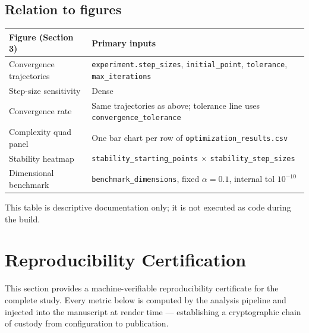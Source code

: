 \documentclass[
]{article}
\newcounter{none} %
\begin{document}
\subsection{Relation to figures}\label{relation-to-figures}

{\def\LTcaptype{none} %
\begin{longtable}[]{@{}
  >{\raggedright\arraybackslash}p{}
  >{\raggedright\arraybackslash}p{}@{}}
\toprule\noalign{}
\begin{minipage}[b]{\linewidth}\raggedright
Figure (Section 3)
\end{minipage} & \begin{minipage}[b]{\linewidth}\raggedright
Primary inputs
\end{minipage} \\
\midrule\noalign{}
\endhead
\bottomrule\noalign{}
\endlastfoot
Convergence trajectories & \texttt{experiment.step\_sizes},
\texttt{initial\_point}, \texttt{tolerance}, \texttt{max\_iterations} \\
Step-size sensitivity & Dense \(\alpha) sweep internal to
\texttt{generate\_step\_size\_sensitivity\_plot()} \\
Convergence rate & Same trajectories as above; tolerance line uses
\texttt{convergence\_tolerance} \\
Complexity quad panel & One bar chart per row of
\texttt{optimization\_results.csv} \\
Stability heatmap & \texttt{stability\_starting\_points} \(\times\)
\texttt{stability\_step\_sizes} \\
Dimensional benchmark & \texttt{benchmark\_dimensions}, fixed
\(\alpha=0.1\), internal tol \(10^{-10}\) \\
\end{longtable}
}

This table is descriptive documentation only; it is not executed as code
during the build.

\newpage

\section{Reproducibility
Certification}\label{reproducibility-certification}

This section provides a machine-verifiable reproducibility certificate
for the complete study. Every metric below is computed by the analysis
pipeline and injected into the manuscript at render time ---
establishing a cryptographic chain of custody from configuration to
publication.
\end{document}
